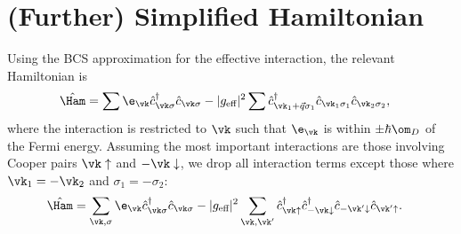 \documentclass[a4paper, 11pt, normalem]{report}
\begin{document}
\section{(Further) Simplified Hamiltonian}
Using the BCS approximation for the effective interaction, the relevant Hamiltonian is
\begin{align}
    \hat{\Ham} &= \sum \e_{\vk}\hat{c}^\dagger_{\vk\sigma}\hat{c}_{\vk\sigma} - |g_{\text{eff}}|^2\sum \hat{c}_{\vk_1+\vec{q}\sigma_1}^\dagger\hat{c}_{\vk_1\sigma_1}\hat{c}_{\vk_2\sigma_2},
\end{align}
where the interaction is restricted to $\vk$ such that $\e_{\vk}$ is within $\pm\hbar\om_D$ of the Fermi energy.
Assuming the most important interactions are those involving Cooper pairs $\vk\uparrow$ and $-\vk\downarrow$, we drop all interaction terms except those where $\vk_1=-\vk_2$ and $\sigma_1=-\sigma_2$:
\begin{align}
    \hat{\Ham} &= \sum_{\vk,\sigma} \e_{\vk}\hat{c}_{\vk\sigma}^\dagger\hat{c}_{\vk\sigma} - |g_{\text{eff}}|^2\sum_{\vk,\vk'} \hat{c}^\dagger_{\vk\uparrow}\hat{c}_{-\vk\downarrow}^\dagger\hat{c}_{-\vk'\downarrow}\hat{c}_{\vk'\uparrow}.
\end{align}
\end{document}

